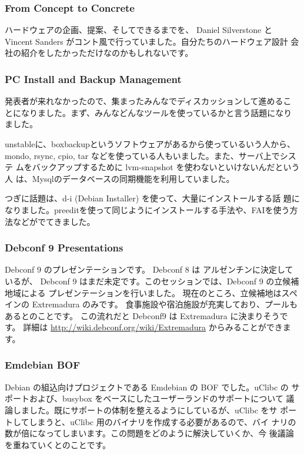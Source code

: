\documentclass[mingoth,a4paper]{jsarticle}
\begin{document}
\subsubsection{From Concept to Concrete}
  ハードウェアの企画、提案、そしてできるまでを、 Daniel Silverstone と 
  Vincent Sanders がコント風で行っていました。自分たちのハードウェア設計
  会社の紹介をしたかっただけなのかもしれないです。

\subsubsection{PC Install and Backup Management}
  発表者が来れなかったので、集まったみんなでディスカッションして進めるこ
  とになりました。まず、みんなどんなツールを使っているかと言う話題になり
  ました。

  unstableに、boxbackupというソフトウェアがあるから使っているいう人から、
  mondo, rsync, cpio, tar などを使っている人もいました。また、サーバ上でシステ
  ムをバックアップするために lvm-snapshot を使わないといけないんだという人
  は、Mysqlのデータベースの同期機能を利用していました。

  つぎに話題は、d-i (Debian Installer) を使って、大量にインストールする話
  題になりました。preeditを使って同じようにインストールする手法や、FAIを使う方
  法などがでてきました。


\subsubsection{Debconf 9 Presentations}
  Debconf 9 のプレゼンテーションです。
  Debconf 8 は アルゼンチンに決定しているが、
  Debconf 9 はまだ未定です。このセッションでは、Debconf 9 の立候補地域による
  プレゼンテーションを行いました。
  現在のところ、立候補地はスペインの Extremadura のみです。
  食事施設や宿泊施設が充実しており、プールもあるとのことです。
  この流れだと Debconf9 は Extremadura に決まりそうです。
  詳細は \url{http://wiki.debconf.org/wiki/Extremadura} からみることができます。

\subsubsection{Emdebian BOF}

  Debian の組込向けプロジェクトである Emdebian の BOF でした。uClibc の
  サポートおよび、busybox をベースにしたユーザーランドのサポートについて
  議論しました。既にサポートの体制を整えるようにしているが、uClibc をサ
  ポートしてしまうと、uClibc 用のバイナリを作成する必要があるので、バイ
  ナリの数が倍になってしまいます。この問題をどのように解決していくか、今
  後議論を重ねていくとのことです。
\end{document}
